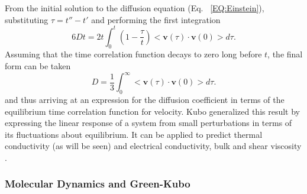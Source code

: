%
From the initial solution to the diffusion equation (Eq. ~\ref{EQ:Einstein}), substituting $\tau=t''-t'$ and performing the first integration
%
\begin{equation}
6Dt=2t\int_0^t\left(1-\frac{\tau}{t}\right)<\bm{v}(\tau)\cdot\bm{v}(0)>d\tau.
\end{equation}
%
Assuming that the time correlation function decays to zero long before $t$, the final form can be taken
%
\begin{equation}
D=\frac{1}{3}\int_0^{\infty}<\bm{v}(\tau)\cdot\bm{v}(0)>d\tau.
\end{equation}
%
and thus arriving at an expression for the diffusion coefficient in terms of the equilibrium time correlation function for velocity. Kubo generalized this result by expressing the linear response of a system from small perturbations in terms of its fluctuations about equilibrium. It can be applied to predict thermal conductivity (as will be seen)\cite{PhysRevB.61.2651} and electrical conductivity, \cite{zwanzig1965time} bulk and shear viscosity \cite{hoover1980lennard}.

\subsubsection {Molecular Dynamics and Green-Kubo}

